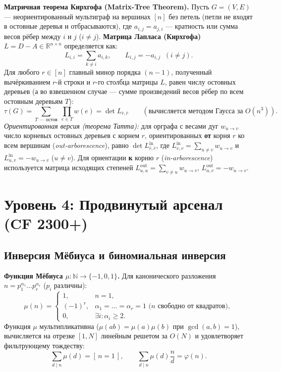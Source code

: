 \documentclass[10pt,a4paper]{article}
\renewcommand{\ge}{\geqslant}
\newcommand{\N}{\mathbb{N}}
\newcommand{\R}{\mathbb{R}}
\newcommand{\iverson}[1]{[\,#1\,]}
\begin{document}
\textbf{Матричная теорема Кирхгофа (Matrix-Tree Theorem).} Пусть $G = (V, E)$ — неориентированный мультиграф на вершинах $[n]$ без петель (петли не входят в остовные деревья и отбрасываются), где $a_{i,j} = a_{j,i}$ — кратность или сумма весов рёбер между $i$ и $j$ ($i \ne j$). \textbf{Матрица Лапласа (Кирхгофа)} $L = D - A \in \R^{n \times n}$ определяется как:
\[
  L_{i,i} = \sum_{k \ne i} a_{i,k}, \qquad L_{i,j} = -a_{i,j} \;\; (i \ne j).
\]
Для любого $r \in [n]$ главный минор порядка $(n - 1)$, полученный вычёркиванием $r$-й строки и $r$-го столбца матрицы $L$, равен числу остовных деревьев (а во взвешенном случае — сумме произведений весов рёбер по всем остовным деревьям $T$):
\[
  \tau(G) = \sum_{T \text{ — остов}} \;\prod_{e \in T} w(e) = \det L_{\bar{r}, \bar{r}} \qquad (\text{вычисляется методом Гаусса за } O(n^3)).
\]
\emph{Ориентированная версия (теорема Татта):} для орграфа с весами дуг $w_{u \to v}$ число корневых остовных деревьев с корнем $r$, ориентированных \textbf{от} корня $r$ ко всем вершинам (\emph{out-arborescence}), равно $\det L^{\mathrm{in}}_{\bar{r}, \bar{r}}$, где $L^{\mathrm{in}}_{v,v} = \sum_{u \ne v} w_{u \to v}$ и $L^{\mathrm{in}}_{u,v} = -w_{u \to v}$ ($u \ne v$). Для ориентации \textbf{к} корню $r$ (\emph{in-arborescence}) используется матрица исходящих степеней $L^{\mathrm{out}}_{u,u} = \sum_{v \ne u} w_{u \to v}$, $L^{\mathrm{out}}_{u,v} = -w_{u \to v}$.

\section{Уровень 4: Продвинутый арсенал (CF 2300+)}

\subsection{Инверсия Мёбиуса и биномиальная инверсия}

\textbf{Функция Мёбиуса $\mu : \N \to \{-1, 0, 1\}$.} Для канонического разложения $n = p_1^{\alpha_1} \dots p_r^{\alpha_r}$ ($p_i$ различны):
\[
  \mu(n) =
  \begin{cases}
    1, & n = 1, \\
    (-1)^r, & \alpha_1 = \dots = \alpha_r = 1 \text{ ($n$ свободно от квадратов)}, \\
    0, & \exists i : \alpha_i \ge 2.
  \end{cases}
\]
Функция $\mu$ мультипликативна ($\mu(ab) = \mu(a)\mu(b)$ при $\gcd(a, b) = 1$), вычисляется на отрезке $[1, N]$ линейным решетом за $O(N)$ и удовлетворяет фильтрующему тождеству:
\[
  \sum_{d \mid n} \mu(d) = \iverson{n = 1}, \qquad \sum_{d \mid n} \mu(d)\frac{n}{d} = \varphi(n).
\]
\end{document}
